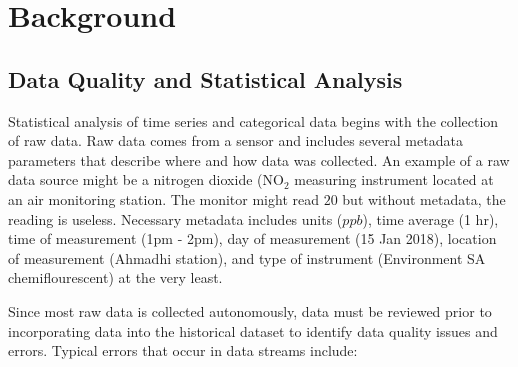 \chapter{Background}

\section{Data Quality and Statistical Analysis}

Statistical analysis of time series and categorical data begins with the collection of raw data. Raw data comes from a sensor and includes several metadata parameters that describe where and how data was collected. An example of a raw data source might be a nitrogen dioxide (NO$_{2}$ measuring instrument located at an air monitoring station. The monitor might read $20$ but without metadata, the reading is useless. Necessary metadata includes units ($ppb$), time average (1 hr), time of measurement (1pm - 2pm), day of measurement (15 Jan 2018), location of measurement (Ahmadhi station), and type of instrument (Environment SA chemiflourescent) at the very least.

Since most raw data is collected autonomously, data must be reviewed prior to incorporating data into the historical dataset to identify data quality issues and errors. Typical errors that occur in data streams include:

